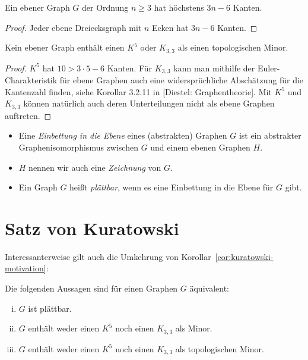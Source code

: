\documentclass[10pt,b5paper]{article}
\begin{document}
\begin{corollary}
Ein ebener Graph $G$ der Ordnung $n\geq 3$ hat höchstens $3n-6$ Kanten.
\end{corollary}

\begin{proof}
Jeder ebene Dreiecksgraph mit $n$ Ecken hat $3n-6$ Kanten.
\end{proof}

\begin{corollary}\label{cor:kuratowski-motivation}
Kein ebener Graph enthält einen $K^5$ oder $K_{3,3}$ als einen topologischen Minor.
\end{corollary}

\begin{proof}
$K^5$ hat $10 > 3\cdot 5 - 6$ Kanten. Für $K_{3,3}$ kann man mithilfe der Euler-Charakteristik für ebene Graphen auch eine widersprüchliche Abschätzung für die Kantenzahl finden, siehe Korollar 3.2.11 in [Diestel: Graphentheorie]. Mit $K^5$ und $K_{3,3}$ können natürlich auch deren Unterteilungen nicht als ebene Graphen auftreten.
\end{proof}

\begin{definition}
\begin{itemize}
\item Eine \textit{Einbettung in die Ebene} eines (abstrakten) Graphen $G$ ist ein abstrakter Graphenisomorphismus zwischen $G$ und einem ebenen Graphen $H$. 
\item $H$ nennen wir auch eine \textit{Zeichnung} von $G$.
\item Ein Graph $G$ heißt \textit{plättbar}, wenn es eine Einbettung in die Ebene für $G$ gibt.
\end{itemize}

\end{definition}

\section{Satz von Kuratowski}

Interessanterweise gilt auch die Umkehrung von Korollar~\ref{cor:kuratowski-motivation}:

\begin{theorem}\label{thm:kuratowski}
Die folgenden Aussagen sind für einen Graphen $G$ äquivalent:
\begin{enumerate}[(i)]
\item $G$ ist plättbar.
\item  $G$ enthält weder einen $K^5$ noch einen $K_{3,3}$ als Minor.
\item  $G$ enthält weder einen $K^5$ noch einen $K_{3,3}$ als topologischen Minor.
\end{enumerate}
\end{theorem}
\end{document}

